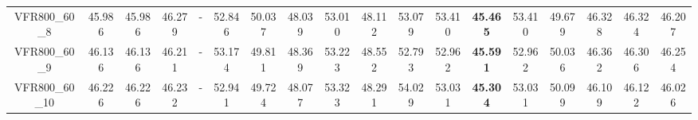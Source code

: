 \begin{tabular}{cc|ccc|ccccccccccccc}
VFR800\_60\_8      & 45.986           & 45.986           & 46.279           & -                & 52.846           & 50.037           & 48.039           & 53.010           & 48.112           & 53.079           & 53.410           & {\bf 45.465}     & 53.410           & 49.679           & 46.328           & 46.324           & 46.207          \\ 
VFR800\_60\_9      & 46.136           & 46.136           & 46.211           & -                & 53.174           & 49.811           & 48.369           & 53.223           & 48.552           & 52.793           & 52.962           & {\bf 45.591}     & 52.962           & 50.036           & 46.362           & 46.306           & 46.254          \\ 
VFR800\_60\_10     & 46.226           & 46.226           & 46.232           & -                & 52.941           & 49.724           & 48.077           & 53.323           & 48.291           & 54.029           & 53.031           & {\bf 45.304}     & 53.031           & 50.099           & 46.109           & 46.122           & 46.026          \\ 
\end{tabular}